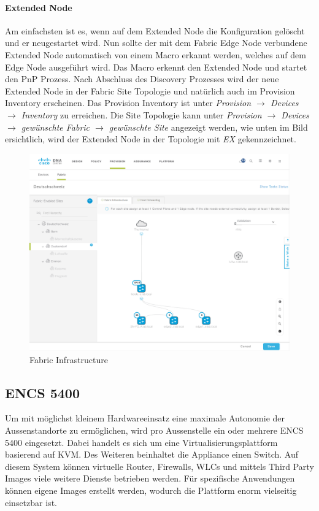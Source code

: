 \paragraph{Extended Node}
Am einfachsten ist es, wenn auf dem Extended Node die Konfiguration gelöscht und er neugestartet wird. Nun sollte der mit dem Fabric Edge Node verbundene Extended Node automatisch von einem Macro erkannt werden, welches auf dem Edge Node ausgeführt wird. Das Macro erkennt den Extended Node und startet den PnP Prozess. Nach Abschluss des Discovery Prozesses wird der neue Extended Node in der Fabric Site Topologie und natürlich auch im Provision Inventory erscheinen. Das Provision Inventory ist unter \textit{Provision $\rightarrow$ Devices $\rightarrow$ Inventory} zu erreichen. Die Site Topologie kann unter \textit{Provision $\rightarrow$ Devices $\rightarrow$ gewünschte Fabric $\rightarrow$ gewünschte Site} angezeigt werden, wie unten im Bild ersichtlich, wird der Extended Node in der Topologie mit \textit{EX} gekennzeichnet.

\begin{figure}[H]
	\centering
	\includegraphics[width=1\linewidth]{img/Absicherung/ExtendedNode4}
	\caption{Fabric Infrastructure}
	\label{fig:Fabric Infrastructure}
\end{figure}



\subsection{ENCS 5400}

Um mit möglichst kleinem Hardwareeinsatz eine maximale Autonomie der Aussenstandorte zu ermöglichen, wird pro Aussenstelle ein oder mehrere ENCS 5400 eingesetzt. 
Dabei handelt es sich um eine Virtualisierungsplattform basierend auf KVM. Des Weiteren beinhaltet die Appliance einen Switch. 
Auf diesem System können virtuelle Router, Firewalls, WLCs und mittels Third Party Images viele weitere Dienste betrieben werden. Für spezifische Anwendungen können eigene Images erstellt werden, wodurch die Plattform enorm vielseitig einsetzbar ist.

